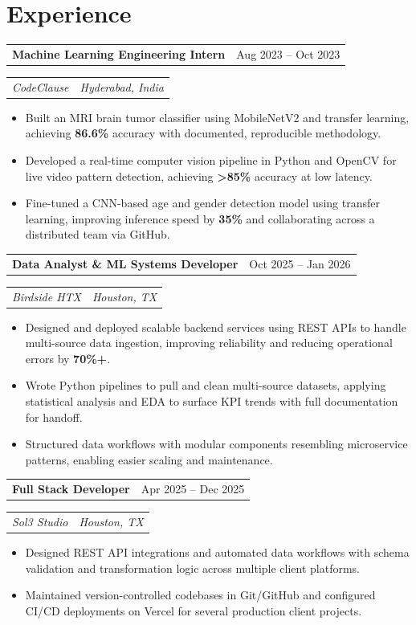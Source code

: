 \documentclass[10pt,letterpaper]{article}
\makeatletter
\newcommand{\roleheading}[2]{%
  \begin{tabularx}{\linewidth}{@{}X r@{}}
    \textbf{\small\color{dark}#1} & \small\textcolor{muted}{#2}
  \end{tabularx}\vspace{-1pt}\par
}
\newcommand{\orgline}[2]{%
  \begin{tabularx}{\linewidth}{@{}X r@{}}
    \textit{\footnotesize\textcolor{muted}{#1}} &
    \textit{\footnotesize\textcolor{muted}{#2}}
  \end{tabularx}\vspace{1pt}\par
}
\makeatother
\begin{document}
\section{Experience}

\roleheading{Machine Learning Engineering Intern}{Aug 2023 -- Oct 2023}
\orgline{CodeClause}{Hyderabad, India}
\begin{itemize}\footnotesize
  \item Built an MRI brain tumor classifier using MobileNetV2 and transfer learning, achieving \textbf{86.6\%} accuracy with documented, reproducible methodology.
  \item Developed a real-time computer vision pipeline in Python and OpenCV for live video pattern detection, achieving \textbf{>85\%} accuracy at low latency.
  \item Fine-tuned a CNN-based age and gender detection model using transfer learning, improving inference speed by \textbf{35\%} and collaborating across a distributed team via GitHub.
\end{itemize}

\vspace{3pt}

\roleheading{Data Analyst \& ML Systems Developer}{Oct 2025 -- Jan 2026}
\orgline{Birdside HTX}{Houston, TX}
\begin{itemize}\footnotesize
  \item Designed and deployed scalable backend services using REST APIs to handle multi-source data ingestion, improving reliability and reducing operational errors by \textbf{70\%+}.
  \item Wrote Python pipelines to pull and clean multi-source datasets, applying statistical analysis and EDA to surface KPI trends with full documentation for handoff.
  \item Structured data workflows with modular components resembling microservice patterns, enabling easier scaling and maintenance.
\end{itemize}

\vspace{3pt}

\roleheading{Full Stack Developer}{Apr 2025 -- Dec 2025}
\orgline{Sol3 Studio}{Houston, TX}
\begin{itemize}\footnotesize
  \item Designed REST API integrations and automated data workflows with schema validation and transformation logic across multiple client platforms.
  \item Maintained version-controlled codebases in Git/GitHub and configured CI/CD deployments on Vercel for several production client projects.
\end{itemize}
\end{document}
